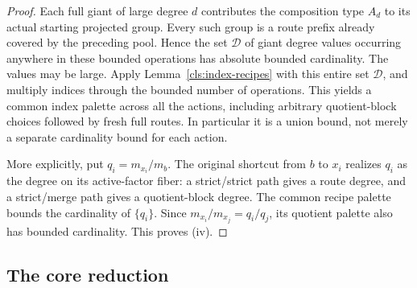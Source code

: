 \begin{proof}
Each full giant of large degree $d$ contributes the composition
type $A_d$ to its actual starting projected group.  Every such group is a route
prefix already covered by the preceding pool.  Hence the set
$\mathcal D$ of giant degree values occurring anywhere in these
bounded operations has absolute bounded cardinality.  The values
may be large.  Apply Lemma~\ref{cls:index-recipes} with this entire
set $\mathcal D$, and multiply indices through the bounded number
of operations.  This yields a common index palette across all the
actions, including arbitrary quotient-block choices followed by
fresh full routes.  In particular it is a union bound, not merely
a separate cardinality bound for each action.

More explicitly, put $q_i=m_{x_i}/m_b$.  The original shortcut from
$b$ to $x_i$ realizes $q_i$ as the degree on its active-factor fiber:
a strict/strict path gives a route degree, and a strict/merge path
gives a quotient-block degree.  The common recipe palette bounds
the cardinality of $\{q_i\}$.  Since
$m_{x_i}/m_{x_j}=q_i/q_j$, its quotient palette also has bounded
cardinality.  This proves (iv).
\end{proof}

\subsection{The core reduction}

